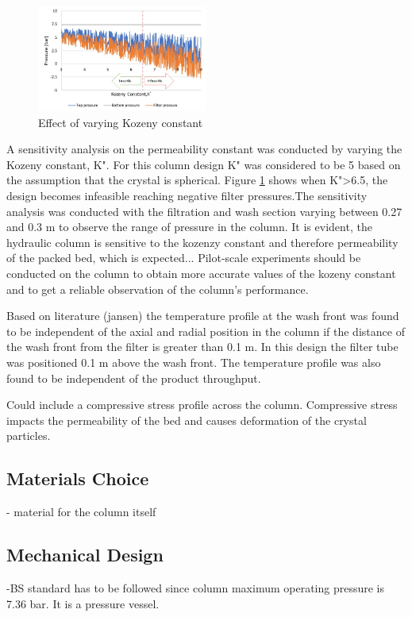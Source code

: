 \begin{figure}
\centering
\includegraphics[width=0.5\textwidth]{chapters/3-separation/figures/kozeny.jpg}
\caption{ Effect of varying Kozeny constant}
\label{fig:koz_col}
\end{figure}

A sensitivity analysis on the permeability constant was conducted by varying the Kozeny constant, K". For this column design K" was considered to be 5 based on the assumption that the crystal is spherical. Figure \ref{fig:koz_col} shows when K">6.5, the design becomes infeasible reaching negative filter pressures.The sensitivity analysis was conducted with the filtration and wash section varying between 0.27 and 0.3 m to observe the range of pressure in the column. It is evident, the hydraulic column is sensitive to the kozenzy constant and therefore permeability of the packed bed, which is expected... Pilot-scale experiments should be conducted on the column to obtain more accurate values of the kozeny constant and to get a reliable observation of the column's performance. 

Based on literature (jansen) the temperature profile at the wash front was found to be independent of the axial and radial position in the column if the distance of the wash front from the filter is greater than 0.1 m. In this design the filter tube was positioned 0.1 m above the wash front. The temperature profile was also found to be independent of the product throughput. 

Could include a compressive stress profile across the column. Compressive stress impacts the permeability of the bed and causes deformation of the crystal particles.


\subsection{Materials Choice}
- material for the column itself 

\subsection{Mechanical Design}
-BS standard has to be followed since column maximum operating pressure is 7.36 bar. It is a pressure vessel.  
